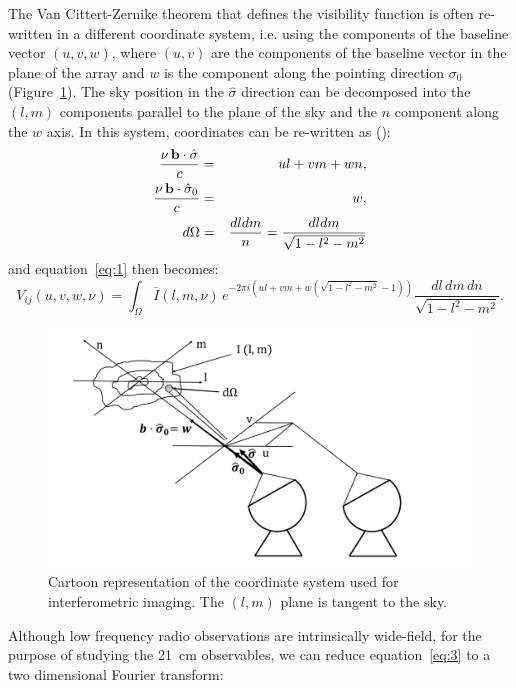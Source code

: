 The Van Cittert-Zernike theorem that defines the visibility function is often re-written in a different coordinate system, i.e. using the components of the baseline vector $(u,v,w)$, where $(u,v)$ are the components of the baseline vector in the plane of the array and $w$ is the component along the pointing direction $\sigma_0$ (Figure~\ref{fig:fig1b}). The sky position in the $\hat {\sigma}$ direction can be decomposed into the $(l,m)$ components parallel to the plane of the sky and the $n$ component along the $w$ axis. In this system, coordinates can be re-written as (\cite{TMS}):
\begin{eqnarray}
\frac{\nu \, {\bf b} \cdot {\hat {\bf \sigma}}}{c} & = & ul + vm + wn, \nonumber \\
\frac{\nu \, {\bf b} \cdot {\hat {\bf \sigma}}_0}{c} & = & w, \nonumber \\
d\Omega & = & \frac{dl dm}{n} = \frac{dl dm}{\sqrt{1 - l^2 - m^2}}
\label{eq:2.1}
\end{eqnarray}
and equation~\ref{eq:1} then becomes:
\begin{equation}
V_{ij} (u,v,w, \nu) = \int_\Omega {\bar I} (l, m, \nu) \, e^{-2 \pi i (ul + vm + w(\sqrt{1 - l^2 - m^2} - 1))} \frac {dl \, dm \, dn}{\sqrt{1 - l^2 - m^2}}.
\label{eq:3}
\end{equation}
%
\begin{figure}[]
\begin{center}
\includegraphics[width=1.\textwidth]{Bernardi/coordinates_imaging_1}
\end{center}
\caption{Cartoon representation of the coordinate system used for interferometric imaging. The $(l,m)$ plane is tangent to the sky.}
\label{fig:fig1b}
\end{figure}
%
Although low frequency radio observations are intrinsically wide-field, for the purpose of studying the 21~cm observables, we can reduce equation~\ref{eq:3} to a two dimensional Fourier transform:
